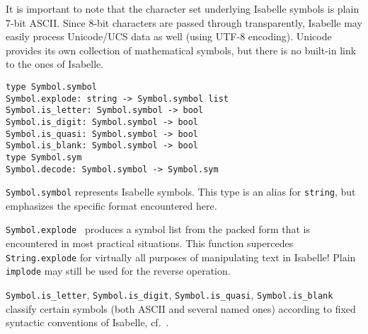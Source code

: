 \begin{isabellebody}
\begin{isamarkuptext}
  \medskip It is important to note that the character set underlying
  Isabelle symbols is plain 7-bit ASCII.  Since 8-bit characters are
  passed through transparently, Isabelle may easily process
  Unicode/UCS data as well (using UTF-8 encoding).  Unicode provides
  its own collection of mathematical symbols, but there is no built-in
  link to the ones of Isabelle.%
\end{isamarkuptext}%
\isamarkuptrue%
%
\endisatagFIXME
{\isafoldFIXME}%
%
\isadelimFIXME
%
\endisadelimFIXME
%
\isadelimmlref
%
\endisadelimmlref
%
\isatagmlref
%
\begin{isamarkuptext}%
\begin{mldecls}
  \verb|type Symbol.symbol| \\
  \verb|Symbol.explode: string -> Symbol.symbol list| \\
  \verb|Symbol.is_letter: Symbol.symbol -> bool| \\
  \verb|Symbol.is_digit: Symbol.symbol -> bool| \\
  \verb|Symbol.is_quasi: Symbol.symbol -> bool| \\
  \verb|Symbol.is_blank: Symbol.symbol -> bool| \\[1ex]
  \verb|type Symbol.sym| \\
  \verb|Symbol.decode: Symbol.symbol -> Symbol.sym| \\
  \end{mldecls}

  \begin{description}

  \item \verb|Symbol.symbol| represents Isabelle symbols.  This
  type is an alias for \verb|string|, but emphasizes the
  specific format encountered here.

  \item \verb|Symbol.explode|~ produces a symbol list from
  the packed form that is encountered in most practical situations.
  This function supercedes \verb|String.explode| for virtually all
  purposes of manipulating text in Isabelle!  Plain \verb|implode|
  may still be used for the reverse operation.

  \item \verb|Symbol.is_letter|, \verb|Symbol.is_digit|, \verb|Symbol.is_quasi|, \verb|Symbol.is_blank| classify certain symbols
  (both ASCII and several named ones) according to fixed syntactic
  conventions of Isabelle, cf.\ \cite{isabelle-isar-ref}.


\end{description}
\end{isamarkuptext}
\end{isabellebody}
